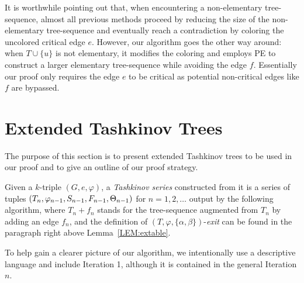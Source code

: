 \documentclass[11pt]{article}
\newcommand{\phiv}{\varphi}
\begin{document}
It is worthwhile pointing out that,  when encountering a non-elementary tree-sequence, almost all previous methods proceed by reducing the size of the non-elementary tree-sequence 
and eventually reach a contradiction by coloring the uncolored critical edge $e$.  However, our algorithm goes the other way around: when $T\cup\{u\}$ is 
not elementary, it modifies the coloring and employs PE to construct a larger elementary tree-sequence while avoiding the edge $f$. Essentially our proof only 
requires the edge $e$ to be critical as potential non-critical edges like $f$ are bypassed.

\section{Extended Tashkinov Trees}

The purpose of this section is to present extended Tashkinov trees to be used in our proof and to give an outline of
our proof strategy.


Given a $k$-triple $(G, e, \phiv)$, a {\em Tashkinov series}\label{taskinovseries} constructed from it is a series of tuples $(T_n, \phiv_{n-1}, \\ S_{n-1}, F_{n-1}, 
\Theta_{n-1})$ for $n=1,2, \ldots $ output by the following algorithm, where $T_n+f_n$ stands for the tree-sequence 
augmented from $T_n$ by adding an edge $f_n$, and the definition of $(T,\varphi,\{\alpha,\beta\})$-{\em exit}  can be found in the paragraph right above Lemma~\ref{LEM:extable}.

To help gain a clearer picture of our algorithm, we intentionally use a descriptive language and include Iteration 1, although it is contained in the general Iteration $n$.

\newpage
\vskip 4mm

\vskip 2mm
\end{document}
